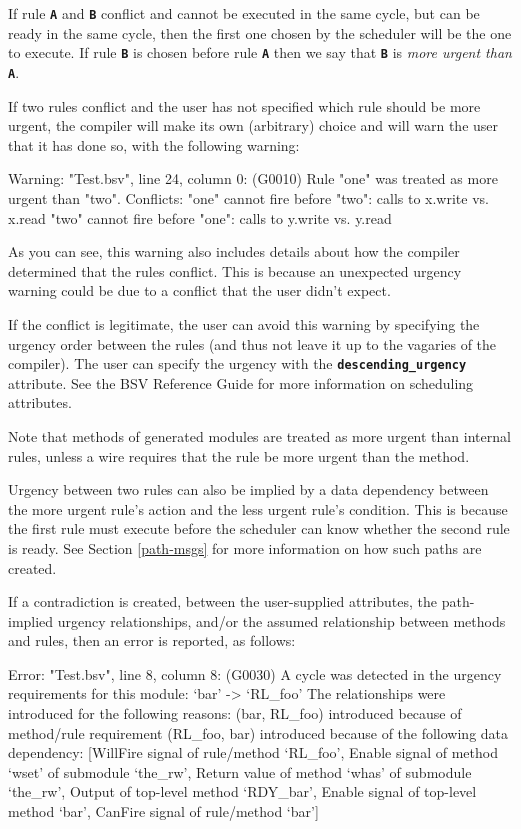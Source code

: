 \documentclass{article}
\newenvironment{centerboxverbatim}
  {\center
   \boxedverbatim}
  {\endboxedverbatim
  {\endcenter }}
\begin{document}
If rule {\bf\tt A} and {\bf\tt B} conflict and cannot be executed in the
same cycle, but can be ready in the same cycle, then the first one
chosen by the scheduler will be the one to execute.  If rule {\bf\tt B}
is chosen before rule {\bf\tt A} then we say that {\bf\tt B} is
\emph{more urgent than} {\bf\tt A}.

If two rules conflict and the user has not specified which rule should
be more urgent, the compiler will make its own (arbitrary) choice and
will warn the user that it has done so, with the following warning:

\begin{centerboxverbatim}
Warning: "Test.bsv", line 24, column 0: (G0010)
  Rule "one" was treated as more urgent than "two". Conflicts:
    "one" cannot fire before "two": calls to x.write vs. x.read
    "two" cannot fire before "one": calls to y.write vs. y.read
\end{centerboxverbatim}

As you can see, this warning also includes details about how the compiler
determined that the rules conflict.  This is because an unexpected
urgency warning could be due to a conflict that the user didn't expect.

If the conflict is legitimate, the user can avoid this warning by
specifying the urgency order between the rules (and thus not leave it
up to the vagaries of the compiler).  The user can specify the urgency
with the {\bf\tt descending\_urgency} attribute.  See the BSV
Reference Guide for more information on scheduling attributes.

Note that methods of generated modules are treated as more urgent than
internal rules, unless a wire requires that the rule be more urgent
than the method.

Urgency between two rules can also be implied by a data dependency
between the more urgent rule's action and the less urgent rule's
condition.  This is because the first rule must execute before the
scheduler can know whether the second rule is ready.  See Section
\ref{path-msgs} for more information on how such paths are created.

If a contradiction is created, between the user-supplied attributes,
the path-implied urgency relationships, and/or the assumed relationship
between methods and rules, then an error is reported, as follows:

\begin{centerboxverbatim}
Error: "Test.bsv", line 8, column 8: (G0030)
  A cycle was detected in the urgency requirements for this module:
    `bar' -> `RL_foo'
  The relationships were introduced for the following reasons:
    (bar, RL_foo) introduced because of method/rule requirement
    (RL_foo, bar) introduced because of the following data dependency:
      [WillFire signal of rule/method `RL_foo',
       Enable signal of method `wset' of submodule `the_rw',
       Return value of method `whas' of submodule `the_rw',
       Output of top-level method `RDY_bar',
       Enable signal of top-level method `bar',
       CanFire signal of rule/method `bar']
\end{centerboxverbatim}
\end{document}
